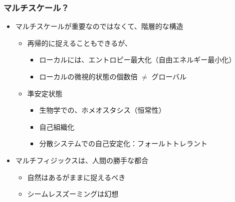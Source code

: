 \documentclass[12pt, dvipdfmx]{beamer}
\begin{document}
\begin{frame}
    \frametitle{マルチスケール？}

    \begin{itemize}
        \item マルチスケールが重要なのではなくて、階層的な構造
        \begin{itemize}
            \item 再帰的に捉えることもできるが、
            \begin{itemize}
                \item ローカルには、エントロピー最大化（自由エネルギー最小化）
                \item ローカルの微視的状態の個数倍 $\neq$ グローバル
            \end{itemize}
            \item 準安定状態
            \begin{itemize}
                \item 生物学での、ホメオスタシス（恒常性）
                \item 自己組織化
                \item 分散システムでの自己安定化：フォールトトレラント
            \end{itemize}
        \end{itemize}
        \item マルチフィジックスは、人間の勝手な都合
        \begin{itemize}
            \item 自然はあるがままに捉えるべき
            \item シームレスズーミングは幻想
        \end{itemize}
    \end{itemize}
\end{frame}
\end{document}
